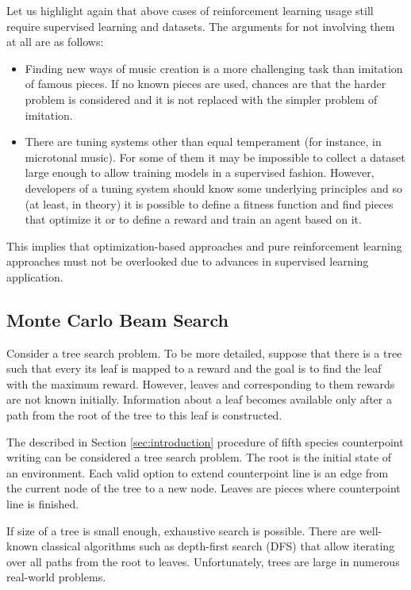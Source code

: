 \documentclass{article}
\begin{document}
Let us highlight again that above cases of reinforcement learning usage still require supervised learning and datasets. The arguments for not involving them at all are as follows:
\begin{itemize}
	\item Finding new ways of music creation is a more challenging task than imitation of famous pieces. If no known pieces are used, chances are that the harder problem is considered and it is not replaced with the simpler problem of imitation.
	\item There are tuning systems other than equal temperament (for instance, in microtonal music). For some of them it may be impossible to collect a dataset large enough to allow training models in a supervised fashion. However, developers of a tuning system should know some underlying principles and so (at least, in theory) it is possible to define a fitness function and find pieces that optimize it or to define a reward and train an agent based on it.
\end{itemize}
This implies that optimization-based approaches and pure reinforcement learning approaches must not be overlooked due to advances in supervised learning application.

\subsection{Monte Carlo Beam Search}
\label{subsec:montecarlo}

Consider a tree search problem. To be more detailed, suppose that there is a tree such that every its leaf is mapped to a reward and the goal is to find the leaf with the maximum reward. However, leaves and corresponding to them rewards are not known initially. Information about a leaf becomes available only after a path from the root of the tree to this leaf is constructed.

The described in Section \ref{sec:introduction} procedure of fifth species counterpoint writing can be considered a tree search problem. The root is the initial state of an environment. Each valid option to extend counterpoint line is an edge from the current node of the tree to a new node. Leaves are pieces where counterpoint line is finished. 

If size of a tree is small enough, exhaustive search is possible. There are well-known classical algorithms such as depth-first search (DFS) that allow iterating over all paths from the root to leaves. Unfortunately, trees are large in numerous real-world problems.
\end{document}
